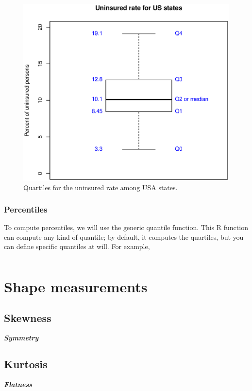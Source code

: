 \documentclass{report}
\newcommand{\code}[1]{\textsf{\ttfamily #1}}
\newcommand{\notefor}[1]{\hfill\textbf{\textit{#1}}}
\begin{document}
		\begin{figure}[h]
			\centering
			\includegraphics[width=1.0\textwidth]{quartiles.eps}
			\caption{Quartiles for the uninsured rate among USA states.}
			\label{fig:queues}
		\end{figure}
		
		\subsubsection{Percentiles}
		To compute percentiles, we will use the generic \code{quantile} function. This R function can compute any kind of quantile; by default, it computes the quartiles, but you can define specific quantiles at will. For example, 
		
		\begin{verbatim}
		\end{verbatim}
		
	\section{Shape measurements}
		\subsection{Skewness}
		\notefor{Symmetry}
		
		\subsection{Kurtosis}
		\notefor{Flatness}
		
\end{document}
